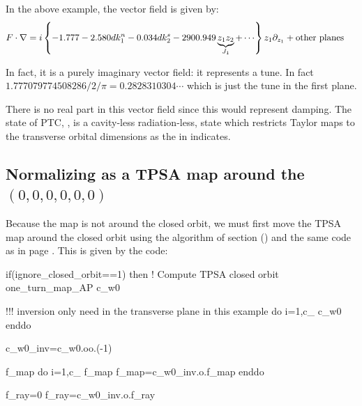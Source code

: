 \documentclass{hitec}     %
\begin{document}
{{ 
 
In the above  example, the vector field is given by:
%
\begin{align} F\cdot \nabla &= i\left\{{-1.777-2.580d{k}_{1}^{n}- 0.034d{k}_{2}^{s}-2900.949\underbrace{{z}_{1}{z}_{2}}\limits_{{J}_{1}}^{}+\cdots}\right\}{z}_{1}{\partial }_{{z}_{1}}+{\rm o}{\rm t}{\rm h}{\rm e}{\rm r}~{\rm p}{\rm l}{\rm a}{\rm n}{\rm e}{\rm s}~\label{eq:vfk1} \end{align}

In fact, it is a purely imaginary vector field: it represents a tune. In fact $1.777079774508286/2/\pi=0.2828310304\cdots$ which is just the tune in the first plane.

There is no real part in this vector field since this would represent damping. The state of PTC,  , is a cavity-less radiation-less, state which restricts Taylor maps to the transverse orbital dimensions as the  in  indicates.


 \subsection{Normalizing as a TPSA map around the  $(0,0,0,0,0,0)$}\label{s:normtpsa}
 
 Because the map is not around the closed orbit, we must first move the TPSA map around the closed orbit using the algorithm of section () and the same code as in page \pageref{p:tpage}.  
 This is given by the code:
 
  
\begin{code}
if(ignore_closed_orbit==1) then
!   Compute TPSA closed orbit
one_turn_map_AP%
c_w0%

!!! inversion only need in the transverse plane in this example
do i=1,c_%
 c_w0%
enddo
 
 c_w0_inv=c_w0.oo.(-1)

f_map%
do i=1,c_%
f_map%
f_map=c_w0_inv.o.f_map
enddo

f_ray=0
f_ray=c_w0_inv.o.f_ray
 

\end{code}}}
\end{document}
